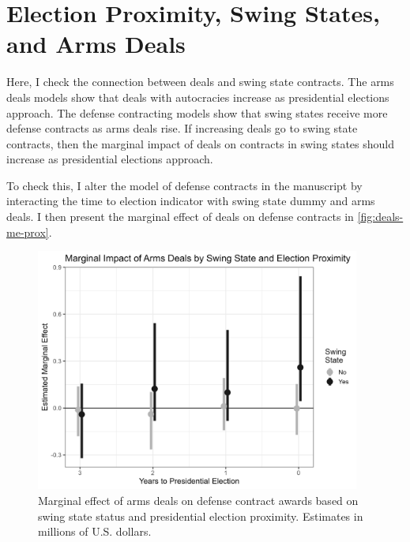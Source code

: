 \documentclass[12pt]{article}
\begin{document}

\newpage 

\section{Election Proximity, Swing States, and Arms Deals}

Here, I check the connection between deals and swing state contracts. 
The arms deals models show that deals with autocracies increase as presidential elections approach. 
The defense contracting models show that swing states receive more defense contracts as arms deals rise.
If increasing deals go to swing state contracts, then the marginal impact of deals on contracts in swing states should increase as presidential elections approach. 


To check this, I alter the model of defense contracts in the manuscript by interacting the time to election indicator with swing state dummy and arms deals. 
I then present the marginal effect of deals on defense contracts in \autoref{fig:deals-me-prox}. 


\begin{figure}[htpb]
	\centering
		\includegraphics[width=0.95\textwidth]{deals-me-prox.png}
	\caption{Marginal effect of arms deals on defense contract awards based on swing state status and presidential election proximity. Estimates in millions of U.S. dollars.}
	\label{fig:deals-me-prox}
\end{figure}
\end{document}
